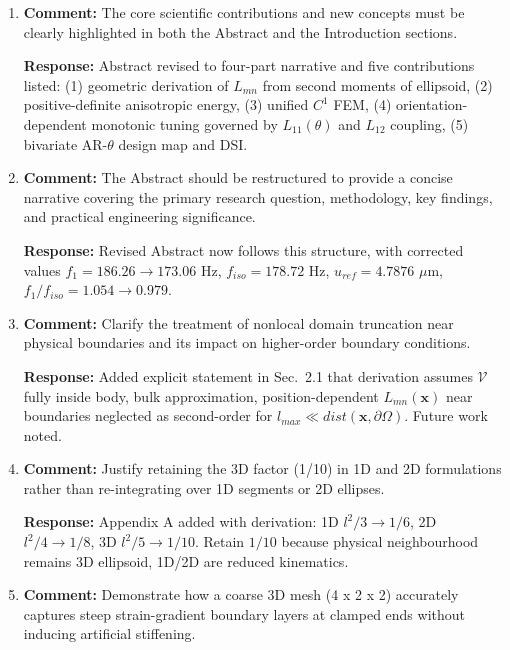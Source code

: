 \documentclass[12pt,a4paper]{article}
\begin{document}
\begin{enumerate}[leftmargin=14pt, itemsep=10pt]

\item \textbf{Comment:} The core scientific contributions and new concepts must be clearly highlighted in both the Abstract and the Introduction sections.

\textbf{Response:} Abstract revised to four-part narrative and five contributions listed: (1) geometric derivation of $L_{mn}$ from second moments of ellipsoid, (2) positive-definite anisotropic energy, (3) unified $C^1$ FEM, (4) orientation-dependent monotonic tuning governed by $L_{11}(\theta)$ and $L_{12}$ coupling, (5) bivariate AR-$\theta$ design map and DSI.

\item \textbf{Comment:} The Abstract should be restructured to provide a concise narrative covering the primary research question, methodology, key findings, and practical engineering significance.

\textbf{Response:} Revised Abstract now follows this structure, with corrected values $f_1=186.26\to173.06$ Hz, $f_{iso}=178.72$ Hz, $u_{ref}=4.7876$ $\mu$m, $f_1/f_{iso}=1.054\to0.979$.

\item \textbf{Comment:} Clarify the treatment of nonlocal domain truncation near physical boundaries and its impact on higher-order boundary conditions.

\textbf{Response:} Added explicit statement in Sec.~2.1 that derivation assumes $\mathcal V$ fully inside body, bulk approximation, position-dependent $L_{mn}(\mathbf x)$ near boundaries neglected as second-order for $l_{max}\ll dist(\mathbf x,\partial\Omega)$. Future work noted.

\item \textbf{Comment:} Justify retaining the 3D factor (1/10) in 1D and 2D formulations rather than re-integrating over 1D segments or 2D ellipses.

\textbf{Response:} Appendix A added with derivation: 1D $l^2/3\to1/6$, 2D $l^2/4\to1/8$, 3D $l^2/5\to1/10$. Retain $1/10$ because physical neighbourhood remains 3D ellipsoid, 1D/2D are reduced kinematics.

\item \textbf{Comment:} Demonstrate how a coarse 3D mesh (4 x 2 x 2) accurately captures steep strain-gradient boundary layers at clamped ends without inducing artificial stiffening.


\end{enumerate}
\end{document}
